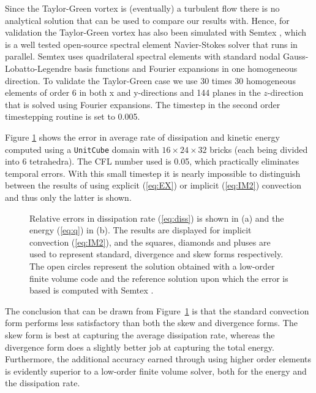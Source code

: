 Since the Taylor-Green vortex is (eventually) a turbulent flow there is no analytical solution that can be used to compare our results with. Hence, for validation the Taylor-Green vortex has also been simulated with Semtex \cite{semtex}, which is a well tested open-source spectral element Navier-Stokes solver that runs in parallel. Semtex uses quadrilateral spectral elements with standard nodal Gauss-Lobatto-Legendre basis functions and Fourier expansions in one homogeneous direction. To validate the Taylor-Green case we use 30 times 30 homogeneous elements of order 6 in both x and y-directions and 144 planes in the $z$-direction that is solved using Fourier expansions. The timestep in the second order timestepping routine is set to 0.005.

Figure \ref{fig:dissipation} shows the error in average rate of dissipation and kinetic energy computed using a {\fontsize{12pt}{12pt}\texttt{UnitCube}} domain with $16\times 24\times 32$ bricks (each being divided into 6 tetrahedra). The CFL number used is 0.05, which practically eliminates temporal errors. With this small timestep it is nearly impossible to distinguish between the results of using explicit (\ref{eq:EX}) or implicit (\ref{eq:IM2}) convection and thus only the latter is shown.
\begin{figure}
  \centering
  \caption{Relative errors in dissipation rate (\ref{eq:diss}) is shown in (a) and the energy (\ref{eq:q}) in (b). The results are displayed for implicit convection (\ref{eq:IM2}), and the squares, diamonds and pluses are used to represent standard, divergence and skew forms respectively. The open circles represent the solution obtained with a low-order finite volume code and the reference solution upon which the error is based is computed with Semtex \cite{semtex}. }
  \label{fig:dissipation}
\end{figure}
The conclusion that can be drawn from Figure~\ref{fig:dissipation} is that the standard convection form performs less satisfactory than both the skew and divergence forms. The skew form is best at capturing the average dissipation rate, whereas the divergence form does a slightly better job at capturing the total energy. Furthermore, the additional accuracy earned through using higher order elements is evidently superior to a low-order finite volume solver, both for the energy and the dissipation rate.



